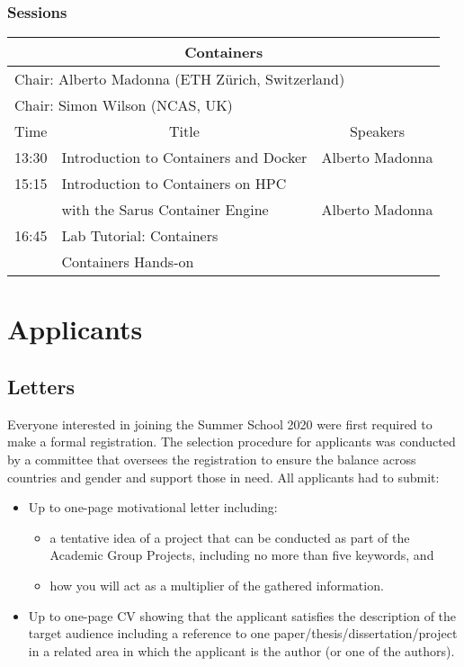 \subsubsection{Sessions}

\begin{table}[H]
\begin{center}
\begin{tabular}{|l|l|l|}
\hline
\multicolumn{3}{|c|}{\textbf{Containers}} \\ \hline
\multicolumn{3}{|l|}{Chair: Alberto Madonna (ETH Zürich, Switzerland)} \\
\multicolumn{3}{|l|}{Chair: Simon Wilson (NCAS, UK)} \\ \hline \hline
Time & \multicolumn{1}{c|}{Title} & \multicolumn{1}{c|}{Speakers} \\ \hline \hline
13:30 & Introduction to Containers and Docker & Alberto Madonna \\ \hline
15:15 & Introduction to Containers on HPC & \\
      & with the Sarus Container Engine & Alberto Madonna \\ \hline
16:45 & Lab Tutorial: Containers & \\ \hline
      & Containers Hands-on & \\ \hline
\hline
\end{tabular}
\end{center}
\end{table}

\section{Applicants}

\subsection{Letters}
\label{sec:letters}

Everyone interested in joining the Summer School 2020 were first required to make a formal registration. The selection procedure for applicants was conducted by a committee that oversees the registration to ensure the balance across countries and gender and support those in need. All applicants had to submit:

\begin{itemize}

\item Up to one-page motivational letter including:
  \begin{itemize}
    \item a tentative idea of a project that can be conducted as part of the Academic Group Projects, including no more than five keywords, and
    \item how you will act as a multiplier of the gathered information.
  \end{itemize}
\item Up to one-page CV showing that the applicant satisfies the description of the target audience including a reference to one paper/thesis/dissertation/project in a related area in which the applicant is the author (or one of the authors).

\end{itemize}

